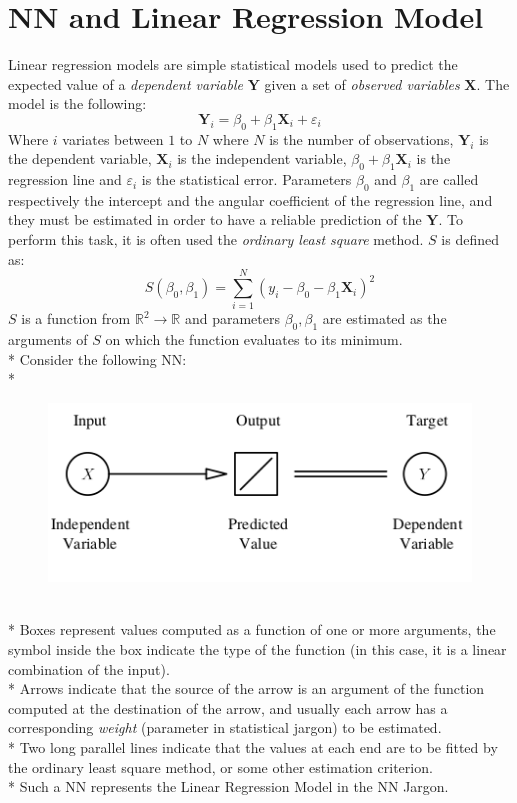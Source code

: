 \documentclass[10pt,a4paper]{article}
\begin{document}
	\section{NN and Linear Regression Model}
	Linear regression models are simple statistical models used to predict the expected value of a \emph{dependent variable} $\textbf{Y}$ given a set of \emph{observed variables} $\textbf{X}$. The model is the following:
	$$
	\textbf{Y}_i = \beta_0 + \beta_1 \textbf{X}_i + \varepsilon_i
	$$
	Where $i$ variates between $1$ to $N$ where $N$ is the number of observations, $\textbf{Y}_i$ is the dependent variable, $\textbf{X}_i$ is the independent variable, $\beta_0 + \beta_1 \textbf{X}_i$ is the regression line and $\varepsilon_i$ is the statistical error. Parameters $\beta_0$ and $\beta_1$ are called respectively the intercept and the angular coefficient of the regression line, and they must be estimated in order to have a reliable prediction of the $\textbf{Y}$. To perform this task, it is often used the \emph{ordinary least square} method. $S$ is defined as:
	$$
	S(\beta_0,\beta_1) = \sum_{i=1}^N (y_i - \beta_0 - \beta_1 \textbf{X}_i)^2
	$$
	$S$ is a function from $\mathbb{R}^2 \rightarrow \mathbb{R}$ and parameters $\beta_0,\beta_1$ are estimated  as the arguments of $S$ on which the function evaluates to its minimum.\\*
	Consider the following NN:\\*
	\begin{figure}[h!]
		\centering
		\includegraphics[scale=2.5]{img/linreg}
	\end{figure}\\*
	Boxes represent values computed as a function of one or more arguments, the symbol inside the box indicate the type of the function (in this case, it is a linear combination of the input).\\*
	Arrows indicate that the source of the arrow is an argument of the function computed at the destination of the arrow, and usually each arrow has a corresponding \emph{weight} (parameter in statistical jargon) to be estimated.\\*
	Two long parallel lines indicate that the values at each end are to be fitted by the ordinary least square method, or some other estimation criterion.\\*
	Such a NN represents the Linear Regression Model in the NN Jargon.
\end{document}
